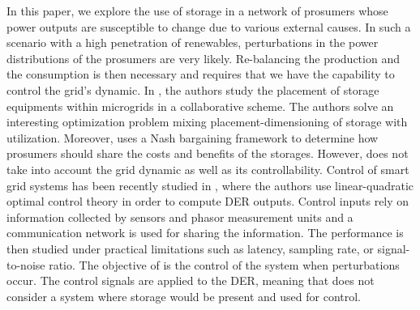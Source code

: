 \documentclass[conference]{IEEEtran}
\begin{document}
In this paper, we explore the use of storage in a network of prosumers whose power outputs are susceptible to change due to various external causes. In such a scenario with a high penetration of renewables, perturbations in the power distributions of the prosumers are very likely. Re-balancing the production and the consumption is then necessary and requires that we have the capability to control the grid's dynamic. In \cite{Gkatzikis2015}, the authors study the placement of storage equipments within microgrids in a collaborative scheme. The authors solve an interesting optimization problem mixing placement-dimensioning of storage with utilization. Moreover, \cite{Gkatzikis2015} uses a Nash bargaining framework to determine how prosumers should share the costs and benefits of the storages. However, \cite{Gkatzikis2015} does not take into account the grid dynamic as well as its controllability. Control of smart grid systems has been recently studied in \cite{Farraj2015}, where the authors use linear-quadratic optimal control theory in order to compute DER outputs. Control inputs rely on information collected by sensors and phasor measurement units and a communication network is used for sharing the information. The performance is then studied under practical limitations such as latency, sampling rate, or signal-to-noise ratio. The objective of \cite{Farraj2015} is the control of the system when perturbations occur. The control signals are applied to the DER, meaning that \cite{Farraj2015} does not consider a system where storage would be present and used for control.



\end{document}
